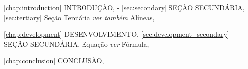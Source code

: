 \newpage
{}

\begin{indexentries}
    \item \ref{chap:introduction} INTRODUÇÃO, \pageref{chap:introduction}-\pageref{sec:tertiary}
    \subitem \ref{sec:secondary} SEÇÃO SECUNDÁRIA, \pageref{sec:secondary}
    \subsubitem \ref{sec:tertiary} Seção Terciária \textit{ver também} Alíneas, \pageref{sec:tertiary}
    \item \ref{chap:development} DESENVOLVIMENTO, \pageref{chap:development}
    \subitem \ref{sec:development_secondary} SEÇÃO SECUNDÁRIA, \pageref{sec:development_secondary}
    \subsubitem Equação \textit{ver} Fórmula, \pageref{eq:example}
    \item \ref{chap:conclusion} CONCLUSÃO, \pageref{chap:conclusion}
\end{indexentries}
